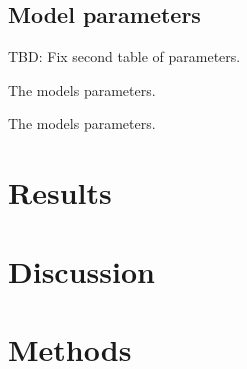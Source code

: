 \documentclass[a4paper]{article}
\begin{document}
\subsection{Model parameters}
TBD: Fix second table of parameters.
%
\begin{table}[h]
	\centering
	
	\caption{The models parameters.}
	\label{tab:params1}
\end{table}
%
%
\begin{table}[h]
	\centering
	
	\caption{The models parameters.}
	\label{tab:params2}
\end{table}
%


\section{Results}

\section{Discussion}

\section{Methods}

%
%
\end{document}
